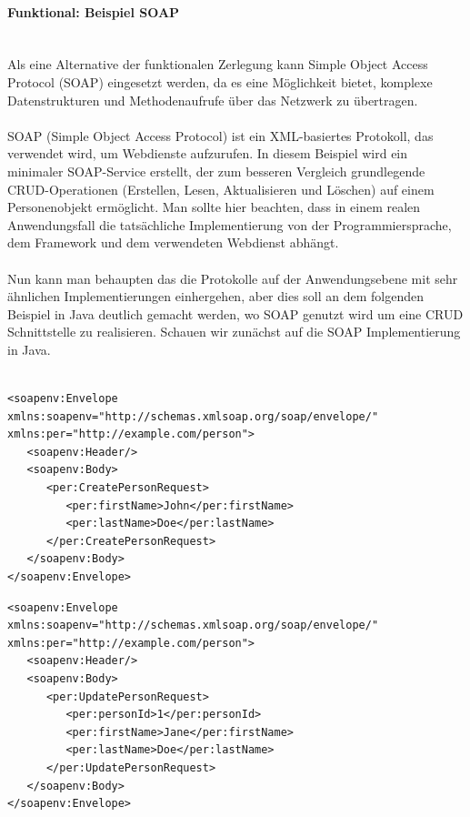 \documentclass[../vs-script-first-v01.tex]{subfiles}
\begin{document}
\paragraph{Funktional: Beispiel SOAP\\\\}
Als eine Alternative der funktionalen Zerlegung kann Simple Object Access Protocol (SOAP) eingesetzt werden, da es eine Möglichkeit bietet, komplexe Datenstrukturen und Methodenaufrufe über das Netzwerk zu übertragen.
\\\\
SOAP (Simple Object Access Protocol) ist ein XML-basiertes Protokoll, das verwendet wird, um Webdienste aufzurufen. In diesem Beispiel wird ein minimaler SOAP-Service erstellt, der zum besseren Vergleich grundlegende CRUD-Operationen (Erstellen, Lesen, Aktualisieren und Löschen) auf einem Personenobjekt ermöglicht. Man sollte hier beachten, dass in einem realen Anwendungsfall die tatsächliche Implementierung von der Programmiersprache, dem Framework und dem verwendeten Webdienst abhängt.
\\\\
Nun kann man behaupten das die Protokolle auf der Anwendungsebene mit sehr ähnlichen Implementierungen einhergehen, aber dies soll an dem folgenden Beispiel in Java deutlich gemacht werden, wo SOAP genutzt wird um eine CRUD Schnittstelle  zu realisieren. 
Schauen wir zunächst auf die SOAP Implementierung in Java. \\\\
\noindent\begin{minipage}{\textwidth}
\begin{lstlisting}[caption={SOAP create},captionpos=b,label={lst:s_create}]
<soapenv:Envelope xmlns:soapenv="http://schemas.xmlsoap.org/soap/envelope/" xmlns:per="http://example.com/person">
   <soapenv:Header/>
   <soapenv:Body>
      <per:CreatePersonRequest>
         <per:firstName>John</per:firstName>
         <per:lastName>Doe</per:lastName>
      </per:CreatePersonRequest>
   </soapenv:Body>
</soapenv:Envelope>
\end{lstlisting}
\end{minipage}
\noindent\begin{minipage}{\textwidth}
\begin{lstlisting}[caption={SOAP update},captionpos=b,label={lst:s_update}]
<soapenv:Envelope xmlns:soapenv="http://schemas.xmlsoap.org/soap/envelope/" xmlns:per="http://example.com/person">
   <soapenv:Header/>
   <soapenv:Body>
      <per:UpdatePersonRequest>
         <per:personId>1</per:personId>
         <per:firstName>Jane</per:firstName>
         <per:lastName>Doe</per:lastName>
      </per:UpdatePersonRequest>
   </soapenv:Body>
</soapenv:Envelope>
\end{lstlisting}
\end{minipage}
\end{document}

